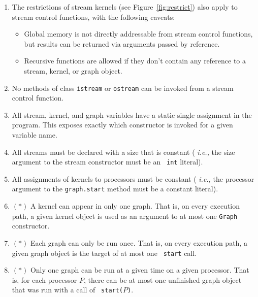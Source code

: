 \begin{enumerate}

\item The restrictions of stream kernels (see
Figure~\ref{fig:restrict}) also apply to stream control functions,
with the following caveats:

\begin{itemize}

\item Global memory is not directly addressable from stream control
functions, but results can be returned via arguments passed by
reference.

\item Recursive functions are allowed if they don't contain any
reference to a stream, kernel, or graph object.

\end{itemize}

\item No methods of class {\tt istream} or {\tt ostream} can be
invoked from a stream control function.

\item All stream, kernel, and graph variables have a static single
assignment in the program.  This exposes exactly which constructor is
invoked for a given variable name.

\item All streams must be declared with a size that is constant ({\it
i.e.,} the size argument to the stream constructor must be an {\tt
int} literal).

\item All assignments of kernels to processors must be constant ({\it
i.e.,} the processor argument to the {\tt graph.start} method must be a
constant literal).

\item $(*)$ A kernel can appear in only one graph.  That is, on every
execution path, a given kernel object is used as an argument to at
most one {\tt Graph} constructor.

\item $(*)$ Each graph can only be run once.  That is, on every
execution path, a given graph object is the target of at most one {\tt
start} call.

\item $(*)$ Only one graph can be run at a given time on a given
processor.  That is, for each processor $P$, there can be at most one
unfinished graph object that was run with a call of {\tt
start(}$P${\tt )}.

\end{enumerate}


